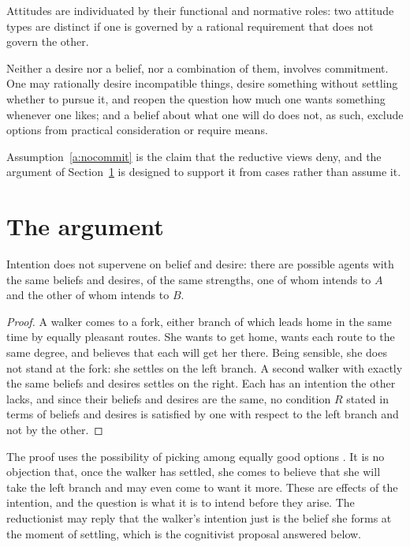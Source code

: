 \documentclass{situationist-preprint}
\begin{document}
\begin{principle}\label{p:func}
Attitudes are individuated by their functional and normative roles: two attitude types are distinct if one is governed by a rational requirement that does not govern the other.
\end{principle}

\begin{assumption}\label{a:nocommit}
Neither a desire nor a belief, nor a combination of them, involves commitment. One may rationally desire incompatible things, desire something without settling whether to pursue it, and reopen the question how much one wants something whenever one likes; and a belief about what one will do does not, as such, exclude options from practical consideration or require means.
\end{assumption}

Assumption~\ref{a:nocommit} is the claim that the reductive views deny, and the argument of Section~\ref{s:arg} is designed to support it from cases rather than assume it.

\section{The argument}\label{s:arg}

\begin{proposition}[Buridan]\label{p:buridan}
Intention does not supervene on belief and desire: there are possible agents with the same beliefs and desires, of the same strengths, one of whom intends to $A$ and the other of whom intends to $B$.
\end{proposition}

\begin{proof}
A walker comes to a fork, either branch of which leads home in the same time by equally pleasant routes. She wants to get home, wants each route to the same degree, and believes that each will get her there. Being sensible, she does not stand at the fork: she settles on the left branch. A second walker with exactly the same beliefs and desires settles on the right. Each has an intention the other lacks, and since their beliefs and desires are the same, no condition $R$ stated in terms of beliefs and desires is satisfied by one with respect to the left branch and not by the other.
\end{proof}

The proof uses the possibility of picking among equally good options \citep{UllmannMargalitMorgenbesser1977}. It is no objection that, once the walker has settled, she comes to believe that she will take the left branch and may even come to want it more. These are effects of the intention, and the question is what it is to intend before they arise. The reductionist may reply that the walker's intention just is the belief she forms at the moment of settling, which is the cognitivist proposal answered below.
\end{document}

